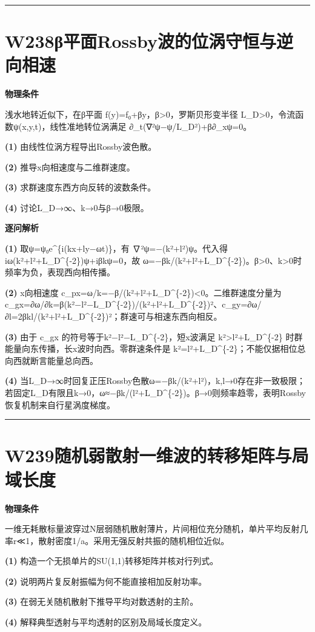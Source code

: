 \documentclass[UTF8,a4paper,11pt,oneside,openany]{ctexbook}
\begin{document}
\par\bigskip\hrule\bigskip
\section*{W238\quad β平面Rossby波的位涡守恒与逆向相速}
\textbf{物理条件}\par 浅水地转近似下，在β平面 f(y)=f₀+βy，β>0，罗斯贝形变半径 L\_D>0，令流函数ψ(x,y,t)，线性准地转位涡满足 ∂\_t(∇²ψ−ψ/L\_D²)+β∂\_xψ=0。
\par\noindent\textbf{(1)} 由线性位涡方程导出Rossby波色散。
\par\noindent\textbf{(2)} 推导x向相速度与二维群速度。
\par\noindent\textbf{(3)} 求群速度东西方向反转的波数条件。
\par\noindent\textbf{(4)} 讨论L\_D→∞、k→0与β→0极限。

\par\medskip\noindent\textbf{逐问解析}
\par\noindent\textbf{(1)} 取ψ=ψ₀e\textasciicircum{}\{i(kx+ly−ωt)\}，有 ∇²ψ=−(k²+l²)ψ。代入得 iω(k²+l²+L\_D\textasciicircum{}\{-2\})ψ+iβkψ=0，故 ω=−βk/(k²+l²+L\_D\textasciicircum{}\{-2\})。β>0、k>0时频率为负，表现西向相传播。
\par\noindent\textbf{(2)} x向相速度 c\_px=ω/k=−β/(k²+l²+L\_D\textasciicircum{}\{-2\})<0。二维群速度分量为 c\_gx=∂ω/∂k=β(k²−l²−L\_D\textasciicircum{}\{-2\})/(k²+l²+L\_D\textasciicircum{}\{-2\})²、c\_gy=∂ω/∂l=2βkl/(k²+l²+L\_D\textasciicircum{}\{-2\})²；群速可与相速东西向相反。
\par\noindent\textbf{(3)} 由于 c\_gx 的符号等于k²−l²−L\_D\textasciicircum{}\{-2\}，短x波满足 k²>l²+L\_D\textasciicircum{}\{-2\} 时群能量向东传播，长x波时向西。零群速条件是 k²=l²+L\_D\textasciicircum{}\{-2\}；不能仅据相位总向西就断言能量总向西。
\par\noindent\textbf{(4)} 当L\_D→∞时回复正压Rossby色散ω=−βk/(k²+l²)，k,l→0存在非一致极限；若固定L\_D有限且k→0，ω≈−βk/(l²+L\_D\textasciicircum{}\{-2\})。β→0则频率趋零，表明Rossby恢复机制来自行星涡度梯度。

\par\bigskip\hrule\bigskip
\section*{W239\quad 随机弱散射一维波的转移矩阵与局域长度}
\textbf{物理条件}\par 一维无耗散标量波穿过N层弱随机散射薄片，片间相位充分随机，单片平均反射几率r≪1，散射密度1/a。采用无强反射共振的随机相位近似。
\par\noindent\textbf{(1)} 构造一个无损单片的SU(1,1)转移矩阵并核对行列式。
\par\noindent\textbf{(2)} 说明两片复反射振幅为何不能直接相加反射功率。
\par\noindent\textbf{(3)} 在弱无关随机散射下推导平均对数透射的主阶。
\par\noindent\textbf{(4)} 解释典型透射与平均透射的区别及局域长度定义。
\end{document}
